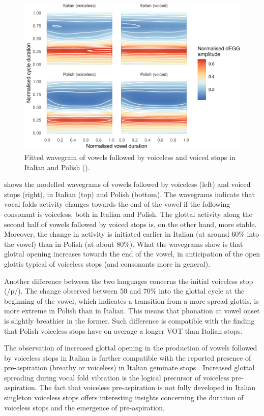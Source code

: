 \documentclass[
  12pt,
  a4paper,
]{article}
\begin{document}
\begin{figure}
\includegraphics[width=\linewidth]{2019-wavegram_files/figure-latex/surface-1} \caption{Fitted wavegram of vowels followed by voiceless and voiced stops in Italian and Polish ().}\label{f:surface}
\end{figure}

 shows the modelled wavegrams of vowels followed by
voiceless (left) and voiced stops (right), in Italian (top) and Polish
(bottom). The wavegrams indicate that vocal folds activity changes
towards the end of the vowel if the following consonant is voiceless,
both in Italian and Polish. The glottal activity along the second half
of vowels followed by voiced stops is, on the other hand, more stable.
Moreover, the change in activity is initiated earlier in Italian (at
around 60\% into the vowel) than in Polish (at about 80\%). What the
wavegrams show is that glottal opening increases towards the end of the
vowel, in anticipation of the open glottis typical of voiceless stops
(and consonants more in general).

Another difference between the two languages concerns the initial
voiceless stop (/p/). The change observed between 50 and 70\% into the
glottal cycle at the beginning of the vowel, which indicates a
transition from a more spread glottis, is more extreme in Polish than in
Italian. This means that phonation at vowel onset is slightly breathier
in the former. Such difference is compatible with the finding that
Polish voiceless stops have on average a longer VOT than Italian stops.

The observation of increased glottal opening in the production of vowels
followed by voiceless stops in Italian is further compatible with the
reported presence of pre-aspiration (breathy or voiceless) in Italian
geminate stops
\citep{stevens2004, stevens2004a, stevens2010, stevens2010b, stevens2014a}.
Increased glottal spreading during vocal fold vibration is the logical
precursor of voiceless pre-aspiration. The fact that voiceless
pre-aspiration is not fully developed in Italian singleton voiceless
stops offers interesting insights concerning the duration of voiceless
stops and the emergence of pre-aspiration.
\end{document}
